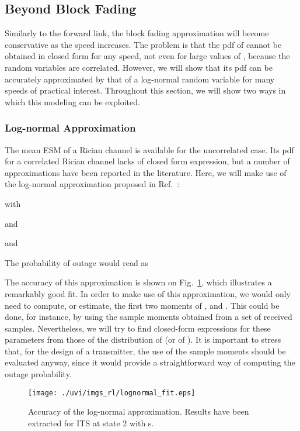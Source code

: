 \documentclass[journal,onecolumn,10pt,a4paper]{IEEEtran}
\begin{document}
\subsection{Beyond Block Fading}
\label{sec:high_speed}
Similarly to the forward link, the block fading approximation will become conservative as the speed increases. The problem is that the pdf of  cannot be obtained in closed form for any speed, not even for large values of , because the random variables  are correlated. However, we will show that its pdf can be accurately approximated by that of a log-normal random variable for many speeds of practical interest. Throughout this section, we will show two ways in which this modeling can be exploited.

\subsubsection{Log-normal Approximation}
\label{subsec:lognormal}
The mean ESM of a Rician channel is available for the uncorrelated case\cite{rico2012}. Its pdf for a correlated Rician channel lacks of closed form expression, but a number of approximations have been reported in the literature. Here, we will make use of the log-normal approximation proposed in Ref.~\cite{donthi2011}:

with


and

and

The probability of outage would read as

The accuracy of this approximation is shown on Fig.~\ref{fig:lognormal_approximation}, which illustrates a remarkably good fit. In order to make use of this approximation, we would only need to compute, or estimate, the first two moments of ,  and . This could be done, for instance, by using the sample moments obtained from a set of received samples. Nevertheless, we will try to find closed-form expressions for these parameters from those of the distribution of  (or of ). It is important to stress that, for the design of a transmitter, the use of the sample moments should be evaluated anyway, since it would provide a straightforward way of computing the outage probability.

\begin{figure}
 \centering
 \texttt{[image: ./uvi/imgs\_rl/lognormal\_fit.eps]}
\caption{Accuracy of the log-normal approximation. Results have been extracted for ITS at state 2 with s.}
 \label{fig:lognormal_approximation}
\end{figure}
\end{document}
